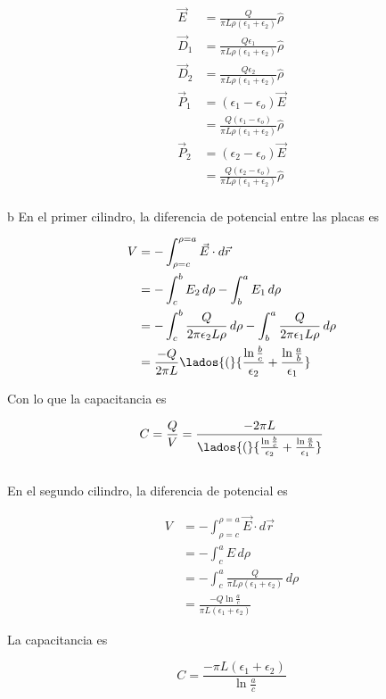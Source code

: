 \begin{solucion}{11}
\begin{equation}
\begin{split}
    \Vec{E} &= \frac{Q}{\pi L\rho(\epsilon_1+\epsilon_2)}
    \hat{\rho}\\
    \Vec{D}_1 &= \frac{Q\epsilon_1}{\pi L\rho(\epsilon_1+\epsilon_2)}\hat{\rho}\\
    \Vec{D}_2 &= \frac{Q\epsilon_2}{\pi L\rho(\epsilon_1+\epsilon_2)}\hat{\rho}\\
    \Vec{P}_1 &= (\epsilon_1-\epsilon_o)\Vec{E}\\
    &= \frac{Q(\epsilon_1-\epsilon_o)}{\pi L\rho(\epsilon_1+\epsilon_2)}\hat{\rho}\\
    \Vec{P}_2 &= (\epsilon_2-\epsilon_o)\Vec{E}\\
    &= \frac{Q(\epsilon_2-\epsilon_o)}{\pi L\rho(\epsilon_1+\epsilon_2)}\hat{\rho}\\
\end{split}
\nonumber
\end{equation}

\ics b
En el primer cilindro, la diferencia de potencial entre las placas es

\begin{equation}
\begin{split}
    V &= -\int^{\rho=a}_{\rho=c}\Vec{E}\cdot d\Vec{r}\\
    &= -\int^b_cE_2\,d\rho-\int^a_bE_1\,d\rho\\
    &= -\int^b_c\frac{Q}{2\pi\epsilon_2 L\rho}\,d\rho-\int^a_b\frac{Q}{2\pi\epsilon_1 L\rho}\,d\rho\\
    &=\frac{-Q}{2\pi L}\lados{(}{\frac{\ln{\frac{b}{c}}}{\epsilon_2}+\frac{\ln{\frac{a}{b}}}{\epsilon_1}}
\end{split}
\nonumber
\end{equation}

Con lo que la capacitancia es

\[C = \frac{Q}{V} = \frac{-2\pi L}{\lados{(}{\frac{\ln{\frac{b}{c}}}{\epsilon_2}+\frac{\ln{\frac{a}{b}}}{\epsilon_1}}}\]\\

En el segundo cilindro, la diferencia de potencial es

\begin{equation}
\begin{split}
    V &= -\int^{\rho=a}_{\rho=c}\Vec{E}\cdot d\Vec{r}\\
    &= -\int^a_cE\,d\rho\\
    &= -\int^a_c\frac{Q}{\pi L\rho(\epsilon_1+\epsilon_2)}\,d\rho\\
    &= \frac{-Q\ln{\frac{a}{c}}}{\pi L(\epsilon_1+\epsilon_2)}
\end{split}
\nonumber
\end{equation}

La capacitancia es

\[C = \frac{-\pi L(\epsilon_1+\epsilon_2)}{\ln{\frac{a}{c}}}\]

\end{solucion}
\bigbreak

